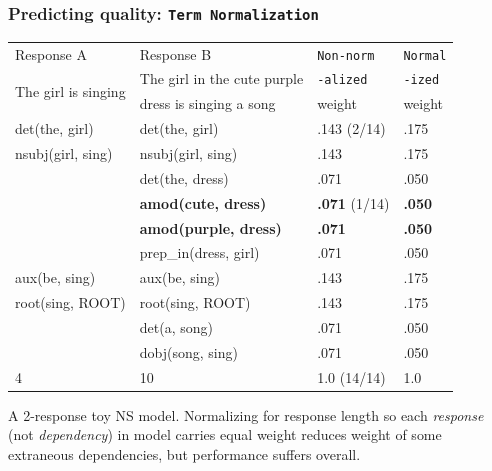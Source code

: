 \documentclass[handout,xcolor={dvipsnames}]{beamer}
\newcommand{\param}[1]{\texttt{#1}}
\begin{document}
\begin{frame}
\frametitle{Predicting quality: \param{Term Normalization}}

\small

\begin{table}[htb!]
\begin{center}
\begin{tabular}{|l|l|l|l|}
\hline
Response A & Response B & \param{Non-norm} & \param{Normal} \\
\cline{0-1}
\multirow{2}{*}{The girl is singing} & \footnotesize{The girl in the cute purple} & \param{-alized} & \param{-ized} \\
& dress is singing a song & weight & weight \\
\hline
\hline
det(the, girl) & det(the, girl) & 				.143 (2/14) & .175 \\
\hline
nsubj(girl, sing) & nsubj(girl, sing) & 		.143 & .175 \\
\hline
& det(the, dress) & 							.071  & .050 \\
\hline
& \textbf{amod(cute, dress)} & 				\textbf{.071} (1/14) & \textbf{.050} \\
\hline
& \textbf{amod(purple, dress)} & 			\textbf{.071} & \textbf{.050} \\
\hline
& prep\_in(dress, girl) & 						.071 & .050 \\
\hline
aux(be, sing) & aux(be, sing) & 				.143 & .175 \\
\hline
root(sing, ROOT) & root(sing, ROOT) & 			.143 & .175 \\
\hline
& det(a, song) & 								.071 & .050 \\
\hline
& dobj(song, sing) & 							.071 & .050 \\
\hline
\hline
4 & 10 & 1.0 (14/14) & 1.0 \\
\hline
\end{tabular}
\end{center}
\end{table}

A 2-response toy NS model. Normalizing for response length so each \textit{response} (not \textit{dependency}) in model carries equal weight reduces weight of some extraneous dependencies, but performance suffers overall.

\end{frame}
\end{document}
